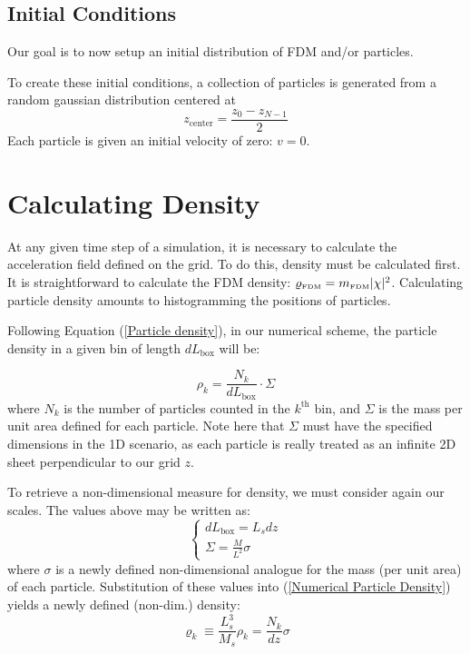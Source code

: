 \documentclass{book}
\begin{document}


\subsection{Initial Conditions}
Our goal is to now setup an initial distribution of FDM and/or particles.

To create these initial conditions, a collection of particles is generated from a random gaussian distribution centered at 
$$z_\text{center} = \frac{z_0 -z_{N-1}}{2} $$
Each particle is given an initial velocity of zero: $v = 0$.


\section{Calculating Density}
At any given time step of a simulation, it is necessary to calculate the acceleration field defined on the grid. To do this, density must be calculated first. It is straightforward to calculate the FDM density: $\varrho_\text{\tiny{FDM}} = m_\text{\tiny{FDM}}|\chi|^2$. Calculating particle density amounts to histogramming the positions of particles.

Following Equation (\ref{Particle density}), in our numerical scheme, the particle density in a given bin of length $d L_\text{box}$ will be:

\begin{equation}
\rho_k = \frac{N_k}{d L_\text{box}}\cdot \Sigma
\label{Numerical Particle Density}
\end{equation}
where $N_k$ is the number of particles counted in the $k^\text{th}$ bin, and $\Sigma$ is the mass per unit area defined for each particle. Note here that $\Sigma$ must have the specified dimensions in the 1D scenario, as each particle is really treated as an infinite 2D sheet perpendicular to our grid $z$. 

To retrieve a non-dimensional measure for density, we must consider again our scales. The values above may be written as:
\begin{equation*}
    \begin{cases}
    d L_\text{box} = L_s dz \\
    \Sigma = \frac{M}{L^2} \sigma
    \end{cases}
\end{equation*}
where $\sigma$ is a newly defined non-dimensional analogue for the mass (per unit area) of each particle. Substitution of these values into (\ref{Numerical Particle Density}) yields a newly defined (non-dim.) density:
$$\varrho_k \equiv \frac{L_s^3}{M_s} \rho_k = \frac{N_k}{dz}\sigma$$
\end{document}
